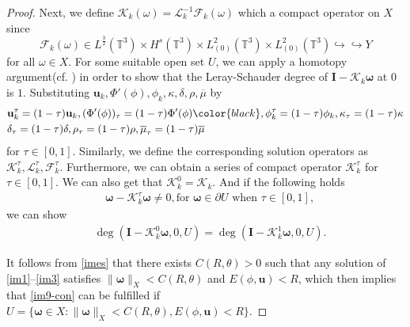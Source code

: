 \documentclass[reqno,a4paper,11pt]{amsart}
\theoremstyle{plain}
\numberwithin{equation}{section}
\begin{document}
\begin{proof}
	
	Next, we define $\mathcal{K}_{k}(\omega)=\mathcal{L}_{k}^{-1}\mathcal{F}_{k}(\omega)$ which a compact operator on $X$ since
	$$\mathcal{F}_{k}(\omega)\in L^{\frac{3}{2}}(\mathbb{T}^{3})\times H^{s}(\mathbb{T}^{3})\times L_{(0)}^{2}(\mathbb{T}^{3})\times L_{(0)}^{2}(\mathbb{T}^{3})\hookrightarrow\hookrightarrow Y$$
	for all $\omega\in X$.
	For some suitable open set $U$,  we can apply a homotopy argument(cf. \cite{NL,TPT}) in order to show that the Leray-Schauder degree of $\mathbf{I}-\mathcal{K}_{k}\mathbf{\omega}$ at $0$ is $1$. Substituting $\mathbf{u}_{k},\Phi'(\phi), \phi_{k}, \kappa,\delta,\rho,\overline{\mu}$ by
	\begin{align*}
		&\mathbf{u}_{k}^{\tau}=(1-\tau)\mathbf{u}_{k}, (\Phi'(\phi))_{\tau}=(1-\tau)\Phi'(\phi)\color{black}, \phi_{k}^{\tau}=(1-\tau)\phi_{k}, \kappa_{\tau}=(1-\tau)\kappa
		\\&\delta_{\tau}=(1-\tau)\delta,\rho_{\tau}=(1-\tau)\rho, \overline{\mu}_{\tau}=(1-\tau)\overline{\mu}
	\end{align*}
	for $\tau\in[0,1]$. Similarly, we define the corresponding solution operators as $\mathcal{K}_{k}^{\tau}, \mathcal{L}_{k}^{\tau}, \mathcal{F}_{k}^{\tau}$. Furthermore, we can obtain a series of compact operator $\mathcal{K}_{k}^{\tau}$ for $\tau \in[0,1]$. We can also get that $\mathcal{K}_{k}^{0}=\mathcal{K}_{k}$.
	And if the following holds
	\begin{align}
		&\mathbf{\omega}-\mathcal{K}_{k}^{\tau}\mathbf{\omega}\neq0, \text{for $\mathbf{\omega} \in \partial U$ when $\tau \in[0,1]$},\label{im9-con}
	\end{align}
	we can show
	\begin{align*}
		&\deg(\mathbf{I}-\mathcal{K}_{k}^{0}\mathbf{\omega},0,U)=\deg(\mathbf{I}-\mathcal{K}_{k}^{1}\mathbf{\omega},0,U).
	\end{align*}
	
	It follows from  \eqref{imes} that there  exists $ C(R,\theta)>0$ such that any solution of \eqref{im1}--\eqref{im3} satisfies  $\|\mathbf{\omega}\|_{X}<C(R,\theta)$  and $E(\phi, \mathbf{u})< R$, which  then implies that  \eqref{im9-con} can be fulfilled if $U=\{\mathbf{\omega}\in X:\|\mathbf{\omega}\|_{X}<C(R,\theta),E(\phi, \mathbf{u})<R\}$.
	

\end{proof}
\end{document}
